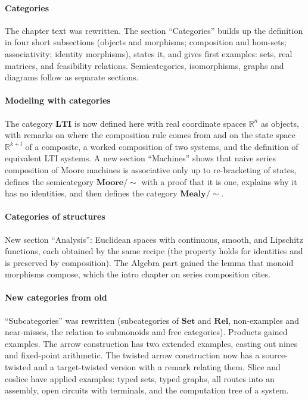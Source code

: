 \documentclass[11pt,a4paper]{article}
\newcommand{\cat}[1]{\mathbf{#1}}
\newcommand{\R}{\mathbb{R}}
\begin{document}
\paragraph{Categories} The chapter text was rewritten. The section ``Categories'' builds up the
definition in four short subsections (objects and morphisms; composition and hom-sets;
associativity; identity morphisms), states it, and gives first examples: sets, real matrices, and
feasibility relations. Semicategories, isomorphisms, graphs and diagrams follow as separate
sections.

\paragraph{Modeling with categories} The category $\cat{LTI}$ is now defined here with real
coordinate spaces $\R^n$ as objects, with remarks on where the composition rule comes from and on
the state space $\R^{k+l}$ of a composite, a worked composition of two systems, and the definition
of equivalent LTI systems. A new section ``Machines'' shows that naive series composition of Moore
machines is associative only up to re-bracketing of states, defines the semicategory
$\cat{Moore}/{\sim}$ with a proof that it is one, explains why it has no identities, and then
defines the category $\cat{Mealy}/{\sim}$.

\paragraph{Categories of structures} New section ``Analysis'': Euclidean spaces with continuous,
smooth, and Lipschitz functions, each obtained by the same recipe (the property holds for
identities and is preserved by composition). The Algebra part gained the lemma that monoid
morphisms compose, which the intro chapter on series composition cites.

\paragraph{New categories from old} ``Subcategories'' was rewritten (subcategories of $\cat{Set}$
and $\cat{Rel}$, non-examples and near-misses, the relation to submonoids and free categories).
Products gained examples. The arrow construction has two extended examples, casting out nines and
fixed-point arithmetic. The twisted arrow construction now has a source-twisted and a
target-twisted version with a remark relating them. Slice and coslice have applied examples:
typed sets, typed graphs, all routes into an assembly, open circuits with terminals, and the
computation tree of a system.
\end{document}
